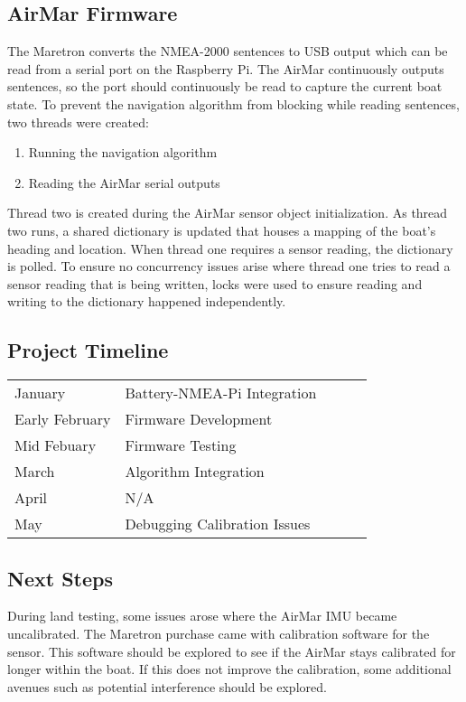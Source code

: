 \documentclass{article}
\begin{document}
\subsection{AirMar Firmware}
The Maretron converts the NMEA-2000 sentences to USB output which can be read from a serial port on the Raspberry Pi. The AirMar continuously outputs sentences, so the port should continuously be read to capture the current boat state. To prevent the navigation algorithm from blocking while reading sentences, two threads were created:
\begin{enumerate}
\item Running the navigation algorithm
\item Reading the AirMar serial outputs
\end{enumerate}
Thread two is created during the AirMar sensor object initialization. As thread two runs, a shared dictionary is updated that houses a mapping of the boat's heading and location. When thread one requires a sensor reading, the dictionary is polled. To ensure no concurrency issues arise where thread one tries to read a sensor reading that is being written, locks were used to ensure reading and writing to the dictionary happened independently. 

\subsection{Project Timeline}

\begin{table}[htp]
\begin{tabular}{l|l|lll}
January        & Battery-NMEA-Pi Integration         &  &  &  \\
Early February & Firmware Development          &  &  &  \\
Mid Febuary    & Firmware Testing       &  &  &  \\
March          & Algorithm Integration         &  &  &  \\
April          & N/A                           &  &  &  \\
May            & Debugging Calibration Issues        &  &  & 
\end{tabular}
\end{table}

\noindent 
\subsection{Next Steps}
    During land testing, some issues arose where the AirMar IMU became uncalibrated. The Maretron purchase came with calibration software for the sensor. This software should be explored to see if the AirMar stays calibrated for longer within the boat. If this does not improve the calibration, some additional avenues such as potential interference should be explored. 
\end{document}
